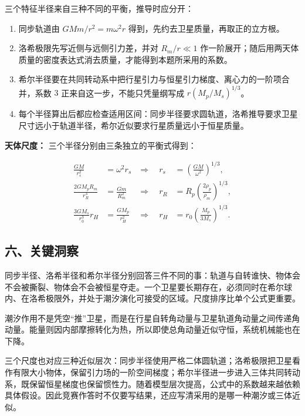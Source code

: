 \documentclass[12pt,a4paper,UTF8]{ctexart}
\newcommand{\tightlist}{\setlength{\itemsep}{0pt}\setlength{\parskip}{0pt}}
\begin{document}
三个特征半径来自三种不同的平衡，推导时应分开：

\begin{enumerate}
\def\labelenumi{\arabic{enumi}.}
\tightlist
\item
  同步轨道由 \(GMm/r^2=m\omega^2r\)
  得到，先约去卫星质量，再取正的立方根。
\item
  洛希极限先写近侧与远侧引力差，并对 \(R_m/r\ll1\)
  作一阶展开；随后用两天体质量的密度表达式消去质量，才能得到本题所采用的系数。
\item
  希尔半径要在共同转动系中把行星引力与恒星引力梯度、离心力的一阶项合并，系数
  \(3\) 正来自这一步，不能只凭量纲写成 \(r(M_p/M_s)^{1/3}\)。
\item
  每个半径算出后都应检查适用区间：同步半径要求圆轨道，洛希推导要求卫星尺寸远小于轨道半径，希尔近似要求行星质量远小于恒星质量。
\end{enumerate}

\textbf{天体尺度：} 三个半径分别由三条独立的平衡式得到：

\[\begin{aligned}
\frac{GM}{r_s^2}&=\omega^2r_s
&\Longrightarrow\quad r_s&=\left(\frac{GM}{\omega^2}\right)^{1/3},\\
\frac{2GM_pR_m}{r_R^3}&=\frac{Gm}{R_m^2}
&\Longrightarrow\quad r_R&=R_p\left(\frac{2\rho_p}{\rho_m}\right)^{1/3},\\
\frac{3GM_s}{r_0^3}r_H&=\frac{GM_p}{r_H^2}
&\Longrightarrow\quad r_H&=r_0\left(\frac{M_p}{3M_s}\right)^{1/3}.
\end{aligned}\]

\subsection{六、关键洞察}\label{ux516dux5173ux952eux6d1eux5bdf-2}

同步半径、洛希半径和希尔半径分别回答三件不同的事：轨道与自转谁快、物体会不会被撕裂、物体会不会被恒星夺走。一个卫星要长期存在，必须同时在希尔球内、在洛希极限外，并处于潮汐演化可接受的区域。尺度排序比单个公式更重要。

潮汐作用不是凭空``推''卫星，而是在行星自转角动量与卫星轨道角动量之间传递角动量。能量则因内部摩擦转化为热，所以即使总角动量近似守恒，系统机械能也在下降。

三个尺度也对应三种近似层次：同步半径使用严格二体圆轨道；洛希极限把卫星看作有限大小物体，保留引力场的一阶空间梯度；希尔半径进一步进入三体共同转动系，既保留恒星梯度也保留惯性力。随着模型层次提高，公式中的系数越来越依赖具体假设。因此竞赛作答时不仅要写结果，还应写清采用的是哪一种潮汐或三体近似。
\end{document}
